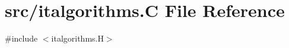 \hypertarget{italgorithms_8_c}{}\section{src/italgorithms.C File Reference}
\label{italgorithms_8_c}
{\ttfamily \#include $<$italgorithms.\+H$>$}\newline
